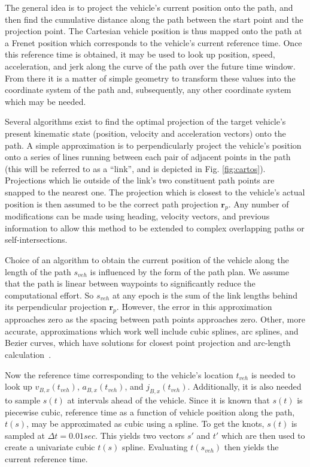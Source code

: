 \documentclass[letterpaper, 10 pt, conference]{ieeeconf}  %
\begin{document}
The general idea is to project the vehicle's current position onto the path, and then find the cumulative distance along the path between the start point and the projection point.
The Cartesian vehicle position is thus mapped onto the path at a Frenet position which corresponds to the vehicle's current reference time.
Once this reference time is obtained, it may be used to look up position, speed, acceleration, and jerk along the curve of the path over the future time window.
From there it is a matter of simple geometry to transform these values into the coordinate system of the path and, subsequently, any other coordinate system which may be needed.


Several algorithms exist to find the optimal projection of the target vehicle's present kinematic state (position, velocity and acceleration vectors) onto the path.
A simple approximation is to perpendicularly project the vehicle's position onto a series of lines running between each pair of adjacent points in the path (this will be referred to as a ``link'', and is depicted in Fig. \ref{fig:cartos}).
Projections which lie outside of the link's two constituent path points are snapped to the nearest one.
The projection which is closest to the vehicle's actual position is then assumed to be the correct path projection $\mathbf{r}_p$.
Any number of modifications can be made using heading, velocity vectors, and previous information to allow this method to be extended to complex overlapping paths or self-intersections.

Choice of an algorithm to obtain the current position of the vehicle along the length of the path $s_{veh}$ is influenced by the form of the path plan.
We assume that the path is linear between waypoints to significantly reduce the computational effort.
So $s_{veh}$ at any epoch is the sum of the link lengths behind its perpendicular projection $\mathbf{r}_p$.
However, the error in this approximation approaches zero as the spacing between path points approaches zero.
Other, more accurate, approximations which work well include cubic splines, arc splines, and Bezier curves, which have solutions for closest point projection and arc-length calculation~\cite{Wang2002,Wang2003,Schindler2011}.

Now the reference time corresponding to the vehicle's location $t_{veh}$ is needed to look up $v_{B,x}(t_{veh})$, $a_{B,x}(t_{veh})$, and $j_{B,x}(t_{veh})$.
Additionally, it is also needed to sample $s(t)$ at intervals ahead of the vehicle.
Since it is known that $s(t)$ is piecewise cubic, reference time as a function of vehicle position along the path, $t(s)$, may be approximated as cubic using a spline.
To get the knots, $s(t)$ is sampled at $\Delta t = 0.01 sec$.
This yields two vectors $s'$ and $t'$ which are then used to create a univariate cubic $t(s)$ spline.
Evaluating $t(s_{veh})$ then yields the current reference time.
\end{document}
